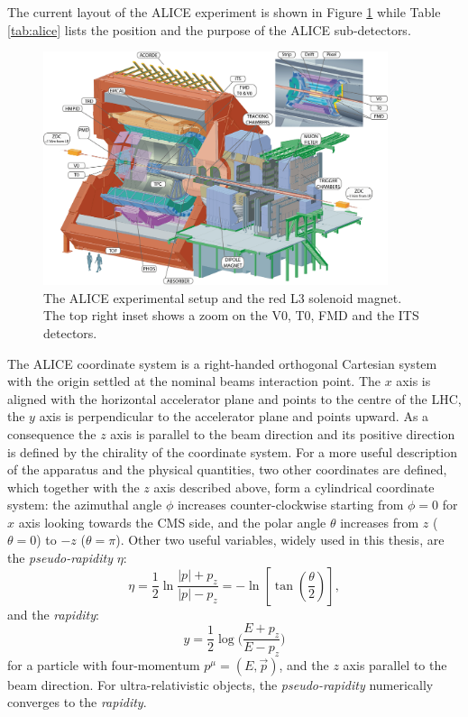 The current layout of the ALICE experiment is shown in Figure \ref{fig:alice3D} while Table 
\ref{tab:alice} lists the position and the purpose of the ALICE sub-detectors.
\begin{figure}
    \centering
    \includegraphics[width=0.9\textwidth]{gfx/alice3D}
	\caption{The ALICE experimental setup and the red L3 solenoid magnet. The top right inset shows a zoom on the V0, T0, FMD and the ITS detectors.}
	\label{fig:alice3D}
\end{figure}
The ALICE coordinate system is a right-handed orthogonal Cartesian system with the origin settled at
the nominal beams interaction point.
The $x$ axis is aligned with the horizontal accelerator plane and points to the centre of the LHC,
the $y$ axis is perpendicular to the accelerator plane and points upward.
As a consequence the $z$ axis is parallel to the beam direction and its positive direction is 
defined by the chirality of the coordinate system. 
For a more useful description of the apparatus and the physical quantities, two other coordinates
are defined, which together with the $z$ axis described above, form a cylindrical coordinate system:
the azimuthal angle $\phi$ increases counter-clockwise starting from $\phi = 0$ for $x$ axis looking
towards the CMS side, and the polar angle $\theta$ increases from $z$ ($\theta=0$) to $-z$ 
($\theta=\pi$).
Other two useful variables, widely used in this thesis, are the \textit{pseudo-rapidity} $\eta$:
\begin{equation}
    \eta = \frac{1}{2} \ln \frac{|p| + p_{z}}{|p| - p_{z}} =
     - \ln \left[ \tan \left(\frac{\theta}{2} \right) \right],
\end{equation}
and the \textit{rapidity}:
\begin{equation} \label{eq:rapidity}
    y = \frac{1}{2} \log \bigl( \frac{E+p_{z}}{E-p_{z}} \bigr) 
\end{equation}
for a particle with four-momentum $p^{\mu} = (E,\vec{p})$, and the $z$ axis parallel to the beam 
direction.
For ultra-relativistic objects, the \textit{pseudo-rapidity} numerically converges to the 
\textit{rapidity}.

